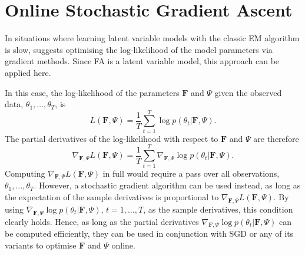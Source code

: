 \documentclass[msc,deptreport.inf]{infthesis} %
\newcommand{\matr}[1]{\mathbf{#1}}
\begin{document}
\section{Online Stochastic Gradient Ascent}\label{sec:gradient_fa}

In situations where learning latent variable models with the classic EM algorithm is slow, \cite{barber2007} suggests optimising the log-likelihood of the model parameters via gradient methods. Since FA is a latent variable model, this approach can be applied here. 

In this case, the log-likelihood of the parameters $\matr{F}$ and $\Psi$ given the observed data, $\theta_1,\dots,\theta_T$, is 
\begin{equation}
	L(\matr{F}, \Psi) = \frac{1}{T} \sum_{t=1}^T \log p(\theta_t | \matr{F}, \Psi).
\end{equation}
The partial derivatives of the log-likelihood with respect to $\matr{F}$ and $\Psi$ are therefore
\begin{equation}
	\nabla_{\matr{F}, \Psi} L(\matr{F}, \Psi) = \frac{1}{T} \sum_{t=1}^T \nabla_{\matr{F}, \Psi} \log p(\theta_t | \matr{F}, \Psi).
\end{equation}
Computing $\nabla_{\matr{F}, \Psi} L(\matr{F}, \Psi)$ in full would require a pass over all observations, $\theta_1, \dots, \theta_T$. However, a stochastic gradient algorithm can be used instead, as long as the expectation of the sample derivatives is proportional to $\nabla_{\matr{F}, \Psi} L(\matr{F}, \Psi)$. By using $\nabla_{\matr{F}, \Psi} \log p(\theta_t | \matr{F}, \Psi)$, $t=1,\dots,T$, as the sample derivatives, this condition clearly holds. Hence, as long as the partial derivatives $\nabla_{\matr{F}, \Psi} \log p(\theta_t | \matr{F}, \Psi)$ can be computed efficiently, they can be used in conjunction with SGD or any of its variants to optimise $\matr{F}$ and $\Psi$ online. 
\end{document}
